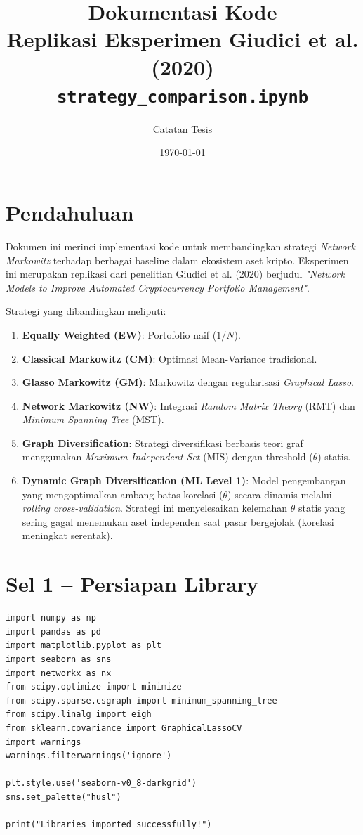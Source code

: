 \documentclass[12pt,a4paper]{article}
\title{\textbf{Dokumentasi Kode} \\ \large Replikasi Eksperimen Giudici et al. (2020) \\
\small \texttt{strategy\_comparison.ipynb}}
\author{Catatan Tesis}
\date{\today}
\begin{document}
\maketitle
\tableofcontents
\newpage

\section{Pendahuluan}
Dokumen ini merinci implementasi kode untuk membandingkan strategi \textit{Network Markowitz} terhadap berbagai baseline dalam ekosistem aset kripto. Eksperimen ini merupakan replikasi dari penelitian Giudici et al. (2020) berjudul \textit{"Network Models to Improve Automated Cryptocurrency Portfolio Management"}.

Strategi yang dibandingkan meliputi:
\begin{enumerate}
    \item \textbf{Equally Weighted (EW)}: Portofolio naif ($1/N$).
    \item \textbf{Classical Markowitz (CM)}: Optimasi Mean-Variance tradisional.
    \item \textbf{Glasso Markowitz (GM)}: Markowitz dengan regularisasi \textit{Graphical Lasso}.
    \item \textbf{Network Markowitz (NW)}: Integrasi \textit{Random Matrix Theory} (RMT) dan \textit{Minimum Spanning Tree} (MST).
    \item \textbf{Graph Diversification}: Strategi diversifikasi berbasis teori graf menggunakan \textit{Maximum Independent Set} (MIS) dengan threshold ($\theta$) statis.
    \item \textbf{Dynamic Graph Diversification (ML Level 1)}: Model pengembangan yang mengoptimalkan ambang batas korelasi ($\theta$) secara dinamis melalui \textit{rolling cross-validation}. Strategi ini menyelesaikan kelemahan $\theta$ statis yang sering gagal menemukan aset independen saat pasar bergejolak (korelasi meningkat serentak).
\end{enumerate}

\section{Sel 1 -- Persiapan Library}
\begin{lstlisting}[caption={Import libraries dan konfigurasi visualisasi}]
import numpy as np
import pandas as pd
import matplotlib.pyplot as plt
import seaborn as sns
import networkx as nx
from scipy.optimize import minimize
from scipy.sparse.csgraph import minimum_spanning_tree
from scipy.linalg import eigh
from sklearn.covariance import GraphicalLassoCV
import warnings
warnings.filterwarnings('ignore')

plt.style.use('seaborn-v0_8-darkgrid')
sns.set_palette("husl")

print("Libraries imported successfully!")
\end{lstlisting}
\end{document}
